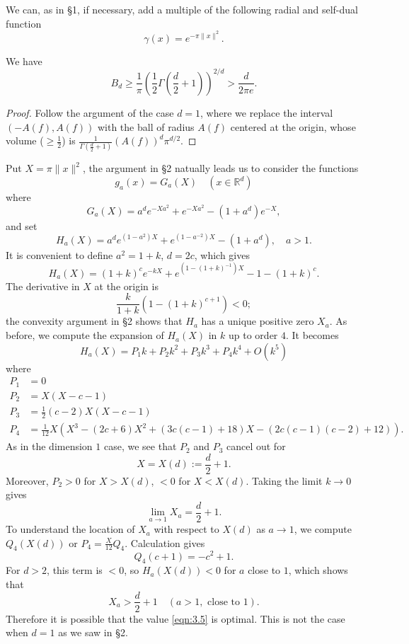 We can, as in \S 1, if necessary, add a multiple of the following radial and self-dual function
\[
    \gamma(x) = e^{-\pi \|x\|^2}.
\]

\begin{theorem}
\label{thm:3.1}
We have
\[
B_d \geq \frac{1}{\pi}\left(\frac{1}{2}\Gamma\left(\frac{d}{2} + 1\right)\right)^{2/d} > \frac{d}{2 \pi e}.
\]
\end{theorem}
\begin{proof}
Follow the argument of the case $d = 1$, where we replace the interval $(-A(f), A(f))$ with the ball of radius $A(f)$ centered at the origin, whose volume ($\geq \frac{1}{2}$) is $\frac{1}{\Gamma(\frac{d}{2} + 1)}(A(f))^{d} \pi^{d/2}$.
\end{proof}

Put $X = \pi \|x\|^2$, the argument in \S 2 natually leads us to consider the functions
\[
    g_a(x) = G_a(X) \quad (x \in \mathbb{R}^{d})
\]
where
\[
    G_a(X) = a^d e^{-X a^2} + e^{-X a^2} - (1 + a^d) e^{-X},
\]
and set
\[
    H_a(X) = a^d e^{(1-a^2)X} + e^{(1 - a^{-2})X} - (1 + a^d), \quad a > 1.
\]
It is convenient to define $a^2 = 1 + k$, $d = 2c$, which gives
\[
    H_a(X) = (1 + k)^{c} e^{-kX} + e^{(1 - (1+k)^{-1})X} - 1 - (1 + k)^{c}.
\]
The derivative in $X$ at the origin is
\[
    \frac{k}{1 + k}\left(1 - (1+k)^{c+1}\right) < 0;
\]
the convexity argument in \S 2 shows that $H_a$ has a unique positive zero $X_a$.
As before, we compute the expansion of $H_a(X)$ in $k$ up to order $4$.
It becomes
\[
    H_a(X) = P_1 k + P_2 k^2 + P_3 k^3 + P_4 k^4 + O(k^5)
\]
where
\begin{align*}
    P_1 &= 0 \\
    P_2 &= X(X - c - 1) \\
    P_3 &= \frac{1}{2}(c - 2)X(X-c-1) \\
    P_4 &= \frac{1}{12} X(X^3 - (2c + 6)X^2 + (3c(c-1) + 18)X - (2c(c-1)(c-2) + 12)).
\end{align*}
As in the dimension $1$ case, we see that $P_2$ and $P_3$ cancel out for
\begin{equation}
    \label{eqn:3.5}
    X = X(d) := \frac{d}{2} + 1.
\end{equation}
Moreover, $P_2 > 0$  for $X > X(d)$, $<0$ for $X < X(d)$.
Taking the limit $k \to 0$ gives
\[
    \lim_{a \to 1} X_a = \frac{d}{2} + 1.
\]
To understand the location of $X_a$ with respect to $X(d)$ as $a \to 1$, we compute $Q_4(X(d))$ or $P_4 = \frac{X}{12}Q_4$.
Calculation gives
\[
    Q_4(c+1) = -c^2 + 1.
\]
For $d > 2$, this term is $<0$, so $H_a(X(d)) < 0$ for $a$ close to $1$, which shows that
\[
    X_a > \frac{d}{2} + 1 \quad(a > 1, \text{ close to }1).
\]
Therefore it is possible that the value \eqref{eqn:3.5} is optimal.
This is not the case when $d = 1$ as we saw in \S 2.

